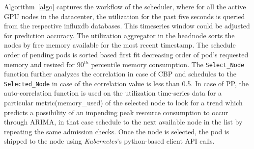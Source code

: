 Algorithm~\ref{algo} captures the workflow of the scheduler, where for all the active GPU nodes in the datacenter, the utilization for the past five seconds is queried from the respective influxdb databases. This timeseries window could be adjusted for prediction accuracy. The utilization aggregator in the headnode sorts the nodes by free memory available for the most recent timestamp. The schedule order of pending pods is sorted based first fit decreasing order of pod's requested memory and resized for 90$^{th}$ percentile memory consumption. The \texttt{Select\_Node} function further analyzes the correlation in case of CBP and schedules to the \texttt{Selected\_Node} in case of the correlation value is less than 0.5. In case of PP, the auto-correlation function is used on the utilization time-series data for a particular metric(memory\_used) of the selected node to look for a trend which predicts a possibility of an impending peak resource consumption to occur through ARIMA, in that case schedule to the next available node in the list by repeating the same admission checks. Once the node is selected, the pod is shipped to the node using \textit{Kubernetes}'s python-based client API calls.





